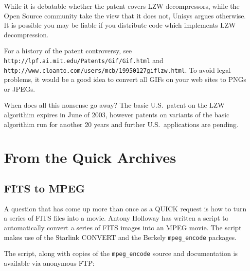 \documentclass[twoside,11pt]{article}
\newcommand{\htmladdnormallink}[2]{#1}
\newcommand{\htmlref}[2]{#1}
\newcommand{\xlabel}[1]{}
\begin{document}
While it is debatable whether the patent covers LZW decompressors, while the Open Source community take the view that it does not, Unisys argues otherwise. It is possible you may be liable if you distribute code which implements LZW decompression. 

For a history of the patent controversy, see \htmladdnormallink{{\tt http://lpf.ai.mit.edu/Patents/Gif/Gif.html}}{http://lpf.ai.mit.edu/Patents/Gif/Gif.html} and \htmladdnormallink{{\tt http://www.cloanto.com/users/mcb/19950127giflzw.html}}{http://www.cloanto.com/users/mcb/19950127giflzw.html}. To avoid legal problems, it would be a good idea to convert all GIFs on your web sites to PNGs or JPEGs.

When does all this nonsense go away? The basic U.S.\ patent on the LZW algorithim expires in June of 2003, however patents on variants of the basic algorithim  run for another 20 years and further U.S.\ applications are pending.  
\section{\xlabel{sc15_archives}From the Quick Archives\label{sc15_archives}}

\subsection{\xlabel{sc15_fits2mpeg}FITS to MPEG\label{sc15_fits2mpeg}}

A question that has come up more than once as a \htmladdnormallink{QUICK}{http://www.starlink.rl.ac.uk/quick/} request is how to turn a series of \htmladdnormallink{FITS}{http://www.cv.nrao.edu/fits/} files into a movie. \htmladdnormallink{Antony Holloway}{mailto:ajh@ast.man.ac.uk} has written a script to automatically convert a series of FITS images into an MPEG movie. The script makes use of the Starlink \htmlref{CONVERT}{sc15_starlink_convert} and the Berkely \htmladdnormallink{{\tt  mpeg\_encode}}{ftp://mm-ftp.cs.berkeley.edu/pub/mpeg/encode/} packages.

The script, along with copies of the {\tt mpeg\_encode} source and documentation is available via anonymous FTP:
\end{document}
